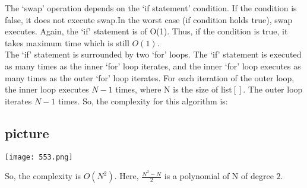 \documentclass[9pt]{beamer}
\begin{document}
\begin{frame}
 The ‘swap’ operation depends on the ‘if statement’ condition. If the condition is false, it does not execute swap.In
the worst case (if condition holds true), swap executes. Again, the ‘if’ statement is of O(1). Thus, if the
condition is true, it takes maximum time which is still $O(1)$.\\
\hspace*{0.5cm} The ‘if’ statement is surrounded by two ‘for’ loops. The ‘if’ statement is executed as many times
as the inner ‘for’ loop iterates, and the inner ‘for’ loop executes as many times as the outer ‘for’ loop
iterates. For each iteration of the outer loop, the inner loop executes $N - 1$ times, where N is the size of
list$[ ]$. The outer loop iterates $N - 1$ times. So, the complexity for this algorithm is:\\

\begin{center}
\section{picture}
\texttt{[image: 553.png]}
\end{center}

So, the complexity is $O(N^{2})$. Here, $ \frac{N^{2} - N}{2}$ is a polynomial of N of degree $2$.\\
\end{frame}
\end{document}
